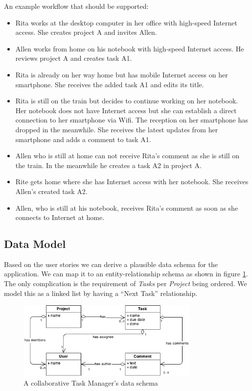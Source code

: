 An example workflow that should be supported:\\

\begin{itemize}
\item Rita works at the desktop computer in her office with high-speed Internet access. She creates project A and invites Allen.
\item Allen works from home on his notebook with high-speed Internet access. He reviews project A and creates task A1.
\item Rita is already on her way home but has mobile Internet access on her smartphone. She receives the added task A1 and edits its title.
\item Rita is still on the train but decides to continue working on her notebook. Her notebook does not have Internet access but she can establish a direct connection to her smartphone via Wifi. The reception on her smartphone has dropped in the meanwhile. She receives the latest updates from her smartphone and adds a comment to task A1.
\item Allen who is still at home can not receive Rita's comment as she is still on the train. In the meanwhile he creates a task A2 in project A.
\item Rite gets home where she has Internet access with her notebook. She receives Allen's created task A2.
\item Allen, who is still at his notebook, receives Rita's comment as soon as she connects to Internet at home.
\end{itemize}

\subsection{Data Model}
Based on the user stories we can derive a plausible data schema for the application. We can map it to an entity-relationship schema as shown in figure \ref{fig:tasks-data-schema}.\\
The only complication is the requirement of \emph{Tasks} per \emph{Project} being ordered. We model this as a linked list by having a ``Next Task'' relationship.

\begin{figure}[tasks-data-schema]
\centering
\includegraphics[width=0.8\textwidth]{img/tasks-schema}
\caption{A collaborative Task Manager's data schema}
\label{fig:tasks-data-schema}
\end{figure}
